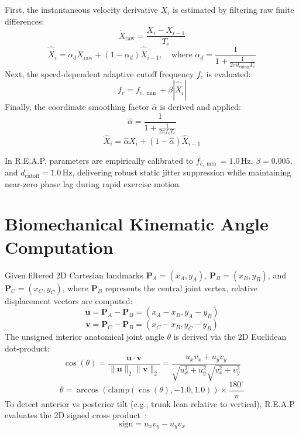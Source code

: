 \documentclass[12pt]{report}
\begin{document}
First, the instantaneous velocity derivative $\dot{X}_i$ is estimated by filtering raw finite differences:
\begin{equation}
    \dot{X}_{\text{raw}} = \frac{X_i - X_{i-1}}{T_e}
\end{equation}
\begin{equation}
    \hat{\dot{X}}_i = \alpha_d \dot{X}_{\text{raw}} + (1 - \alpha_d) \hat{\dot{X}}_{i-1}, \quad \text{where } \alpha_d = \frac{1}{1 + \frac{1}{2\pi d_{\text{cutoff}} T_e}}
\end{equation}
Next, the speed-dependent adaptive cutoff frequency $f_c$ is evaluated:
\begin{equation}
    f_c = f_{c,\min} + \beta |\hat{\dot{X}}_i|
\end{equation}
Finally, the coordinate smoothing factor $\hat{\alpha}$ is derived and applied:
\begin{equation}
    \hat{\alpha} = \frac{1}{1 + \frac{1}{2\pi f_c T_e}}
\end{equation}
\begin{equation}
    \hat{X}_i = \hat{\alpha} X_i + (1 - \hat{\alpha}) \hat{X}_{i-1}
\end{equation}

In R.E.A.P, parameters are empirically calibrated to $f_{c,\min} = 1.0$\,Hz, $\beta = 0.005$, and $d_{\text{cutoff}} = 1.0$\,Hz, delivering robust static jitter suppression while maintaining near-zero phase lag during rapid exercise motion.

\section{Biomechanical Kinematic Angle Computation}
Given filtered 2D Cartesian landmarks $\mathbf{P}_A = (x_A, y_A)$, $\mathbf{P}_B = (x_B, y_B)$, and $\mathbf{P}_C = (x_C, y_C)$, where $\mathbf{P}_B$ represents the central joint vertex, relative displacement vectors are computed:
\begin{equation}
    \mathbf{u} = \mathbf{P}_A - \mathbf{P}_B = (x_A - x_B, y_A - y_B)
\end{equation}
\begin{equation}
    \mathbf{v} = \mathbf{P}_C - \mathbf{P}_B = (x_C - x_B, y_C - y_B)
\end{equation}
The unsigned interior anatomical joint angle $\theta$ is derived via the 2D Euclidean dot-product:
\begin{equation}
    \cos(\theta) = \frac{\mathbf{u} \cdot \mathbf{v}}{\|\mathbf{u}\|_2 \|\mathbf{v}\|_2} = \frac{u_x v_x + u_y v_y}{\sqrt{u_x^2 + u_y^2} \sqrt{v_x^2 + v_y^2}}
\end{equation}
\begin{equation}
    \theta = \arccos\left( \text{clamp}(\cos(\theta), -1.0, 1.0) \right) \times \frac{180^\circ}{\pi}
\end{equation}
To detect anterior vs posterior tilt (e.g., trunk lean relative to vertical), R.E.A.P evaluates the 2D signed cross product~\cite{myers2014biomechanical}:
\begin{equation}
    \text{sign} = u_x v_y - u_y v_x
\end{equation}
\end{document}
